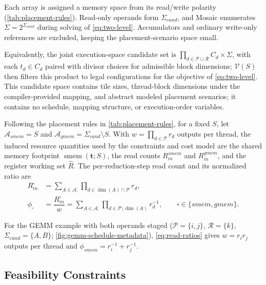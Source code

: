 \documentclass[acmsmall,review,anonymous,screen]{acmart}
\newcommand{\name}{{Mosaic}\xspace}
\newcommand{\tile}{t}
\newcommand{\tvec}{\mathbf{t}}
\newcommand{\rblk}{r}
\newcommand{\work}{w}
\begin{document}
Each array is assigned a memory space from its read/write polarity
(\autoref{tab:placement-rules}). Read-only operands form
\(\Sigma_{\mathit{cand}}\), and \name enumerates
\(\Sigma=2^{\Sigma_{\mathit{cand}}}\) during solving of
\autoref{eq:two-level}. Accumulators and ordinary write-only references are
excluded, keeping the placement-scenario space small.

Equivalently, the joint execution-space candidate set is \(\prod_{d\in\mathcal{P}\cup\mathcal{R}} C_d \times \Sigma\), with each \(\tile_d\in C_d\) paired with divisor choices for admissible block dimensions; \(\mathcal{V}(S)\) then filters this product to legal configurations for the objective of \autoref{eq:two-level}. This candidate space contains tile sizes, thread-block dimensions under the compiler-provided mapping, and abstract modeled placement scenarios; it contains no schedule, mapping structure, or execution-order variables.

Following the placement rules in \autoref{tab:placement-rules}, for a fixed \(S\), let \(\mathcal{A}_{\mathit{smem}}=S\) and \(\mathcal{A}_{\mathit{gmem}}=\Sigma_{\mathit{cand}}\setminus S\). With \(\work=\prod_{d\in\mathcal{P}}\rblk_d\) outputs per thread, the induced resource quantities used by the constraints and cost model are the shared memory footprint \(\operatorname{smem}(\tvec;S)\), the read counts \(R^{\mathit{smem}}_{\mathit{in}}\) and \(R^{\mathit{gmem}}_{\mathit{in}}\), and the register working set \(\hat{R}\). The per-reduction-step read count and its normalized ratio are
\begin{equation}
\begin{aligned}
R^{\square}_{\mathit{in}}
&=\sum_{A \in \mathcal{A}_{\square}}
  \prod_{d \in \dim(A) \cap \mathcal{P}} \rblk_d,\\[0.6ex]
\phi_{\square}
&=\dfrac{R^{\square}_{\mathit{in}}}{\work}
 =\sum_{A \in \mathcal{A}_{\square}}
  \prod_{d \in \mathcal{P} \setminus \dim(A)} \rblk_d^{-1},
\qquad \square \in \{\mathit{smem},\mathit{gmem}\}.
\end{aligned}
\label{eq:read-ratios}
\end{equation}

For the GEMM example with both operands staged (\(\mathcal{P}=\{i,j\}\), \(\mathcal{R}=\{k\}\), \(\Sigma_{\mathit{cand}}=\{A,B\}\); \autoref{fig:gemm-schedule-metadata}), \autoref{eq:read-ratios} gives \(\work=\rblk_i\rblk_j\) outputs per thread and \(\phi_{\mathit{smem}}=\rblk_i^{-1}+\rblk_j^{-1}\).

\subsection{Feasibility Constraints}
\label{sec:constraints}
\label{sec:register-filter}
\end{document}
